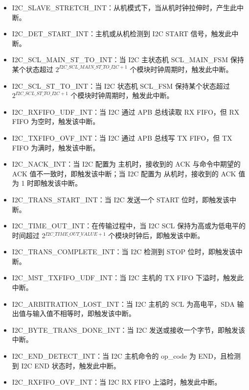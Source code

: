 \documentclass[main\_\_CN.tex]{subfiles}
\begin{document}
\begin{itemize}
\item \label{int:i2c-slave-stretch}I2C\_SLAVE\_STRETCH\_INT：从机模式下，当从机时钟拉伸时，产生此中断。
\item \label{int:i2c-start}I2C\_DET\_START\_INT：主机或从机检测到 I2C START 信号，触发此中断。
\item \label{int:i2c-scl-main-fsm}I2C\_SCL\_MAIN\_ST\_TO\_INT：当 I2C 主状态机 SCL\_MAIN\_FSM 保持某个状态超过 \(2^{\hyperref[fielddesc:I2CSCLMAINSTTOI2C]{I2C\_SCL\_MAIN\_ST\_TO\_I2C}+1}\) 个模块时钟周期时，触发此中断。
\item \label{int:i2c-scl-fsm}I2C\_SCL\_ST\_TO\_INT：当 I2C 状态机 SCL\_FSM 保持某个状态超过 \(2^{\hyperref[fielddesc:I2CSCLSTTOI2C]{I2C\_SCL\_ST\_TO\_I2C}+1}\) 个模块时钟周期时，触发此中断。
\item \label{int:i2c-rxfifo-udf}I2C\_RXFIFO\_UDF\_INT：当 I2C 通过 APB 总线读取 RX FIFO，但 RX FIFO 为空时，触发该中断。
\item \label{int:i2c-txfifo-ovf}I2C\_TXFIFO\_OVF\_INT：当 I2C 通过 APB 总线写 TX FIFO，但 TX FIFO 为满时，触发该中断。
\item \label{int:i2c-nack}I2C\_NACK\_INT：当 I2C 配置为 主机时，接收到的 ACK 与命令中期望的 ACK 值不一致时，即触发该中断；当 I2C 配置为 从机时，接收到的 ACK 值为 1 时即触发该中断。
\item \label{int:i2c-trans-start}I2C\_TRANS\_START\_INT：当 I2C 发送一个 START 位时，即触发该中断。
\item \label{int:i2c-time-out}I2C\_TIME\_OUT\_INT：在传输过程中，当 I2C SCL 保持为高或为低电平的时间超过 2$^{\hyperref[fielddesc:I2CTIMEOUTVALUE]{I2C\_TIME\_OUT\_VALUE}+1}$ 个模块时钟后，即触发该中断。
\item \label{int:i2c-trans-complete}I2C\_TRANS\_COMPLETE\_INT：当 I2C 检测到 STOP 位时，即触发该中断。
\item \label{int:i2c-mst-txfifo-udf}I2C\_MST\_TXFIFO\_UDF\_INT：当 I2C 主机的 TX FIFO 下溢时，触发此中断。
\item \label{int:i2c-arbitration-lost}I2C\_ARBITRATION\_LOST\_INT：当 I2C 主机的 SCL 为高电平，SDA 输出值与输入值不相等时，即触发该中断。
\item \label{int:i2c-byte-trans-done}I2C\_BYTE\_TRANS\_DONE\_INT：当 I2C 发送或接收一个字节，即触发该中断。
\item \label{int:i2c-end}I2C\_END\_DETECT\_INT：当 I2C 主机命令的 op\_code 为 END，且检测到 I2C END 状态时，触发此中断。
\item \label{int:i2c-rxfifo-ovf}I2C\_RXFIFO\_OVF\_INT：当 I2C RX FIFO 上溢时，触发此中断。

\end{itemize}
\end{document}
